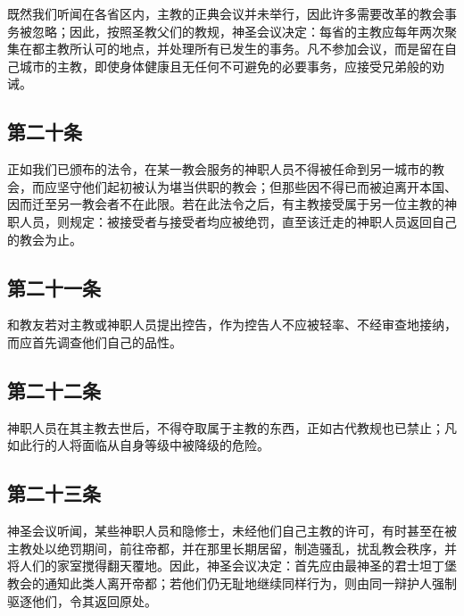 既然我们听闻在各省区内，主教的正典会议并未举行，因此许多需要改革的教会事务被忽略；因此，按照圣教父们的教规，神圣会议决定：每省的主教应每年两次聚集在都主教所认可的地点，并处理所有已发生的事务。凡不参加会议，而是留在自己城市的主教，即使身体健康且无任何不可避免的必要事务，应接受兄弟般的劝诫。\par


\subsection{第二十条}

正如我们已颁布的法令，在某一教会服务的神职人员不得被任命到另一城市的教会，而应坚守他们起初被认为堪当供职的教会；但那些因不得已而被迫离开本国、因而迁至另一教会者不在此限。若在此法令之后，有主教接受属于另一位主教的神职人员，则规定：被接受者与接受者均应被绝罚，直至该迁走的神职人员返回自己的教会为止。\par


\subsection{第二十一条}

和教友若对主教或神职人员提出控告，作为控告人不应被轻率、不经审查地接纳，而应首先调查他们自己的品性。\par


\subsection{第二十二条}

神职人员在其主教去世后，不得夺取属于主教的东西，正如古代教规也已禁止；凡如此行的人将面临从自身等级中被降级的危险。\par


\subsection{第二十三条}

神圣会议听闻，某些神职人员和隐修士，未经他们自己主教的许可，有时甚至在被主教处以绝罚期间，前往帝都，并在那里长期居留，制造骚乱，扰乱教会秩序，并将人们的家室搅得翻天覆地。因此，神圣会议决定：首先应由最神圣的君士坦丁堡教会的通知此类人离开帝都；若他们仍无耻地继续同样行为，则由同一辩护人强制驱逐他们，令其返回原处。\par

